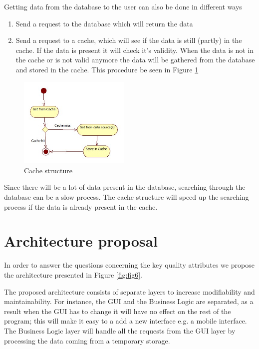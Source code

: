 \documentclass{article}
\begin{document}
Getting data from the database to the user can also be done in different ways
\begin{enumerate}
\item Send a request to the database which will return the data
\item Send a request to a cache, which will see if the data is still (partly) in the cache. If the data is present it will check it's validity. When the data is not in the cache or is not valid anymore the data will be gathered from the database and stored in the cache.  This procedure be seen in Figure \ref{fig:fig5}
\end{enumerate}

\begin{figure}[!]
\centering
\includegraphics[width=200px]{Cached}
\caption{Cache structure}
\label{fig:fig5}
\end{figure}

Since there will be a lot of data present in the database, searching through the database can be a slow process. The cache structure will speed up the searching process if the data is already present in the cache. 
\section*{Architecture proposal}

In order to answer the questions concerning the key quality attributes we propose the architecture presented in Figure \ref{fig:fig6}.


The proposed architecture consists of separate layers to increase
modifiability and maintainability. For instance, the GUI and the Business Logic
are separated, as a result when the GUI has to change it will have no effect on
the rest of the program; this will make it easy to a add a new interface e.g.
a mobile interface. The Business Logic layer will handle all the requests from
the GUI layer by processing the data coming from a temporary storage. 
\end{document}
